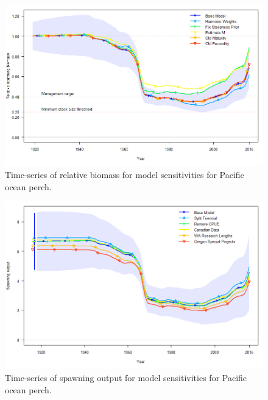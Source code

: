 \documentclass[12pt,]{article}
\begin{document}
\begin{figure}
\centering
\includegraphics{Figures/depl_sens1.png}
\caption{Time-series of relative biomass for model sensitivities for
Pacific ocean perch. \label{fig:sens1_depl}}
\end{figure}

\FloatBarrier

\begin{figure}
\centering
\includegraphics{Figures/ssb_sens2.png}
\caption{Time-series of spawning output for model sensitivities for
Pacific ocean perch. \label{fig:sens2_ssb}}
\end{figure}

\FloatBarrier
\end{document}
